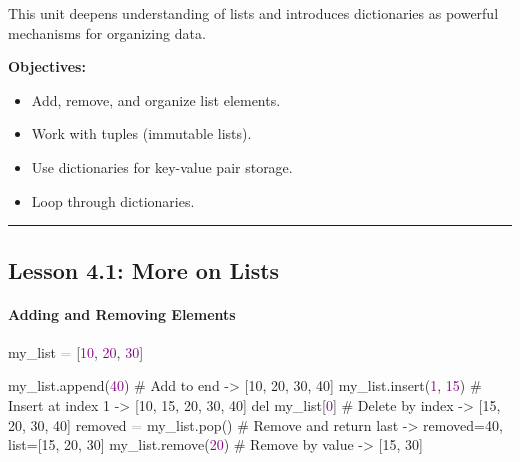 \documentclass[
  justified,
  openright,
]{tufte-book}
\let\subsubsection\paragraph
\let\paragraph\paragraph
\newcommand{\CommentTok}[1]{\textcolor{MidGray}{#1}}
\newcommand{\DecValTok}[1]{\textcolor{Purple}{#1}}
\newcommand{\KeywordTok}[1]{\textcolor{BrandBlue}{#1}}
\newcommand{\NormalTok}[1]{#1}
\newcommand{\OperatorTok}[1]{\textcolor{DarkGray}{#1}}
\newenvironment{Shaded}{%
  \begin{snugshade}
}{%
  \end{snugshade}
}
\let\subsubsection\paragraph
\let\paragraph\paragraph
\providecommand{\tightlist}{%
  \setlength{\itemsep}{0pt}\setlength{\parskip}{0pt}}
\begin{document}
This unit deepens understanding of lists and introduces dictionaries as
powerful mechanisms for organizing data.

\textbf{Objectives:}

\begin{itemize}
\tightlist
\item
  Add, remove, and organize list elements.
\item
  Work with tuples (immutable lists).
\item
  Use dictionaries for key-value pair storage.
\item
  Loop through dictionaries.
\end{itemize}

\begin{center}\rule{0.5\linewidth}{0.5pt}\end{center}

\subsection{Lesson 4.1: More on Lists}\label{lesson-4.1-more-on-lists}

\subsubsection{Adding and Removing
Elements}\label{adding-and-removing-elements}

\begin{Shaded}
\begin{Highlighting}[]
\NormalTok{my\_list }\OperatorTok{=}\NormalTok{ [}\DecValTok{10}\NormalTok{, }\DecValTok{20}\NormalTok{, }\DecValTok{30}\NormalTok{]}

\NormalTok{my\_list.append(}\DecValTok{40}\NormalTok{)          }\CommentTok{\# Add to end {-}\textgreater{} [10, 20, 30, 40]}
\NormalTok{my\_list.insert(}\DecValTok{1}\NormalTok{, }\DecValTok{15}\NormalTok{)       }\CommentTok{\# Insert at index 1 {-}\textgreater{} [10, 15, 20, 30, 40]}
\KeywordTok{del}\NormalTok{ my\_list[}\DecValTok{0}\NormalTok{]              }\CommentTok{\# Delete by index {-}\textgreater{} [15, 20, 30, 40]}
\NormalTok{removed }\OperatorTok{=}\NormalTok{ my\_list.pop()     }\CommentTok{\# Remove and return last {-}\textgreater{} removed=40, list=[15, 20, 30]}
\NormalTok{my\_list.remove(}\DecValTok{20}\NormalTok{)          }\CommentTok{\# Remove by value {-}\textgreater{} [15, 30]}
\end{Highlighting}
\end{Shaded}
\end{document}
